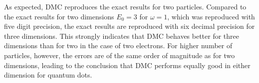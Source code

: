 As expected, DMC reproduces the exact results for two particles. Compared to the exact results for two dimensions $E_0=3$ for $\omega=1$, which was reproduced with five digit precision, the exact results are reproduced with six decimal precision for three dimensions. This strongly indicates that DMC behaves better for three dimensions than for two in the case of two electrons. For higher number of particles, however, the errors are of the same order of magnitude as for two dimensions, leading to the conclusion that DMC performs equally good in either dimension for quantum dots. 



% 
